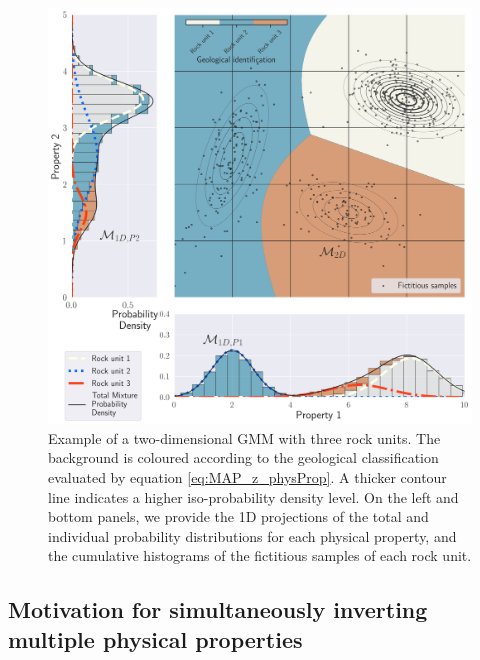 \documentclass[extra, mreferee]{gji_joint} %
\begin{document}
\begin{figure}
    \centering
    \includegraphics[width=\columnwidth]{Fig/LowRes/GaussianMixture_3C_1and2D.png}
    \caption{Example of a two-dimensional GMM with three rock units. The background is coloured according to the geological classification evaluated by equation \eqref{eq:MAP_z_physProp}. A thicker contour line indicates a higher iso-probability density level. On the left and bottom panels, we provide the 1D projections of the total and individual probability distributions for each physical property, and the cumulative histograms of the fictitious samples of each rock unit.}
    \label{fig:GaussianMixture_3C_1and2D.png}
\end{figure}

\subsection{Motivation for simultaneously inverting multiple physical properties}
\end{document}
